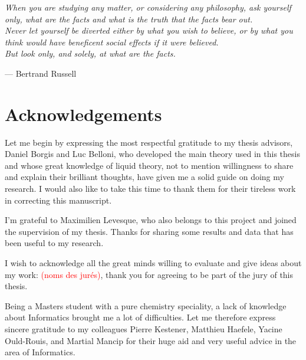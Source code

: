 
\begin{flushright}
\textsl{When you are studying any matter, or considering any philosophy,
ask yourself only, what are the facts and what is the truth that the
facts bear out.}\\
\textsl{ Never let yourself be diverted either by what you wish to
believe, or by what you think would have beneficent social effects
if it were believed.}\\
\textsl{ But look only, and solely, at what are the facts.}
\par\end{flushright}

\begin{flushright}
--- Bertrand Russell 
\par\end{flushright}

\bigskip{}


\begingroup
\let\clearpage\relax
\let\cleardoublepage\relax 


\chapter*{Acknowledgements}

Let me begin by expressing the most respectful gratitude to my thesis
advisors, Daniel Borgis and Luc Belloni, who developed the main theory
used in this thesis and whose great knowledge of liquid theory, not to 
mention willingness to share and explain their brilliant thoughts, have 
given me a solid guide on doing my research. I would also like to take 
this time to thank them for their tireless work in correcting this manuscript.

I'm grateful to Maximilien Levesque, who also belongs to this
project and joined the supervision of my thesis. Thanks for sharing
some results and data that has been useful to my research.

I wish to acknowledge all the great minds willing to evaluate
and give ideas about my work: \textcolor{red}{(noms des jurés)}, thank
you for agreeing to be part of the jury of this thesis.

Being a Masters student with a pure chemistry speciality, a lack
of knowledge about Informatics brought me a lot of difficulties. Let me therefore
express sincere gratitude to my colleagues Pierre
Kestener, Matthieu Haefele, Yacine Ould-Rouis, and Martial Mancip
for their huge aid and very useful advice in the area of Informatics.

